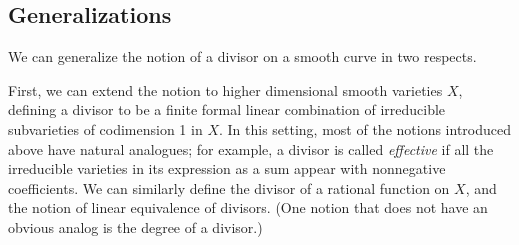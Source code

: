 %
%
%
%

\subsection{Generalizations}

We can generalize the notion of a divisor on a smooth curve in two respects.

First, we can extend the notion to higher dimensional smooth varieties $X$, defining a divisor to be a finite formal linear combination of irreducible subvarieties of codimension 1 in $X$. In this setting, most of the notions introduced above have natural analogues; for example, a divisor is called \emph{effective} if all the irreducible varieties in its expression as a sum appear with nonnegative coefficients. We can similarly define the divisor of a rational function on $X$, and the notion of linear equivalence of divisors. (One notion that does not have an obvious analog is the degree of a divisor.)

